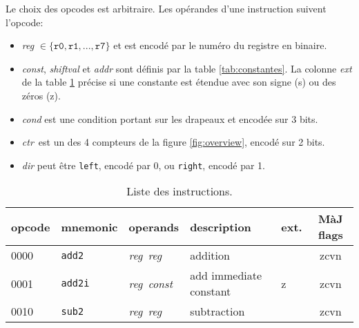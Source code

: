 \documentclass[architecture]{compas2018}
\newcommand{\reg}{\textit{reg}}
\newcommand{\const}{\textit{const}}
\newcommand{\ctr}{\textit{ctr}}
\begin{document}
\iffalse

Benchmark pour échanges
(pour binmult matmul)
make
for i in `seq 1 4`
do
./emu/emu --basic prog/binmult.bin -cm $i
done | ./matmulstats/percents.py

for i in `seq 1 4`
do
./emu/emu --basic prog/matmul.bin -cm $i --load 65536:mat32x32.bytes
done | ./matmulstats/percents.py

python3 ./matmulstats/makematrix.py 0.1
for i in `seq 1 4`
do
./emu/emu --basic prog/matmul.bin -cm $i --load 65536:mat32x32.bytes
done | ./matmulstats/percents.py

Chip8 c'est du chrono
$
\fi

\appendix
\begin{table}[!h]
  \caption{Liste des instructions.}
  \label{tab:opcodes}
  Le choix des opcodes est arbitraire.
  Les opérandes d'une instruction suivent l'opcode:
  \begin{itemize}
\item \textit{reg} $\in \{\mathtt{r0}, \mathtt{r1}, ..., \mathtt{r7}\}$ et est encodé par le numéro du registre en binaire.
\item \textit{const}, \textit{shiftval} et \textit{addr} sont définis par la table \ref{tab:constantes}. La colonne \emph{ext} de la table  \ref{tab:opcodes} précise si une constante est étendue avec son signe (s) ou des zéros (z).   
\item  \textit{cond} est une condition portant sur les drapeaux et encodée sur 3 bits.
\item \ctr\ est un des 4 compteurs de la figure \ref{fig:overview}, encodé sur 2 bits.
\item \textit{dir} peut être \texttt{left}, encodé par 0, ou \texttt{right}, encodé par 1.
\end{itemize}
\begin{center}
  \begin{tabular}{|l|l|l|l|l|c|}
    \hline  
    opcode  & mnemonic        & operands                      & description                                          & ext. & {MàJ flags} \\
    \hline  
    \hline  
    0000    & \texttt{add2}   & \reg\ \reg\                   & addition                                             &      & zcvn        \\
    \hline
    0001    & \texttt{add2i}  & \reg\ \const\                 & add immediate constant                               & z    & zcvn        \\
    \hline
    0010    & \texttt{sub2}   & \reg\ \reg\                   & subtraction                                          &      & zcvn        \\

\end{tabular}
\end{center}
\end{table}
\end{document}
